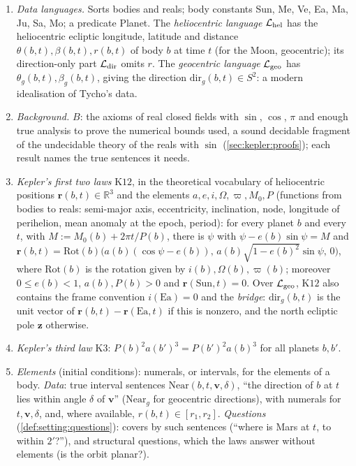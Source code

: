 \begin{definition}\label{def:kepler:language}
\leavevmode
\begin{enumerate}[label=(\roman*),leftmargin=*,itemsep=1pt]
\item \emph{Data languages.} Sorts bodies and reals; body constants Sun, Me, Ve, Ea, Ma, Ju, Sa, Mo; a predicate Planet. The \emph{heliocentric language} $\mathcal L_{\rm hel}$ has the heliocentric ecliptic longitude, latitude and distance $\theta(b,t),\beta(b,t),r(b,t)$ of body $b$ at time $t$ (for the Moon, geocentric); its direction-only part $\mathcal L_{\rm dir}$ omits $r$. The \emph{geocentric language} $\mathcal L_{\rm geo}$ has $\theta_g(b,t),\beta_g(b,t)$, giving the direction $\mathrm{dir}_g(b,t)\in S^2$: a modern idealisation of Tycho's data.
\item \emph{Background.} $B$: the axioms of real closed fields with $\sin$, $\cos$, $\pi$ and enough true analysis to prove the numerical bounds used, a sound decidable fragment of the undecidable theory of the reals with $\sin$ (\cref{sec:kepler:proofs}); each result names the true sentences it needs.
\item \emph{Kepler's first two laws} $\mathrm{K12}$, in the theoretical vocabulary of heliocentric positions $\mathbf r(b,t)\in\mathbb R^3$ and the elements $a,e,i,\Omega,\varpi,M_0,P$ (functions from bodies to reals: semi-major axis, eccentricity, inclination, node, longitude of perihelion, mean anomaly at the epoch, period): for every planet $b$ and every $t$, with $M:=M_0(b)+2\pi t/P(b)$, there is $\psi$ with $\psi-e(b)\sin\psi=M$ and $\mathbf r(b,t)=\mathrm{Rot}(b)\big(a(b)(\cos\psi-e(b)),\,a(b)\sqrt{1-e(b)^2}\sin\psi,\,0\big)$, where $\mathrm{Rot}(b)$ is the rotation given by $i(b),\Omega(b),\varpi(b)$; moreover $0\le e(b)<1$, $a(b),P(b)>0$ and $\mathbf r(\mathrm{Sun},t)=0$. Over $\mathcal L_{\rm geo}$, $\mathrm{K12}$ also contains the frame convention $i(\mathrm{Ea})=0$ and the \emph{bridge}: $\mathrm{dir}_g(b,t)$ is the unit vector of $\mathbf r(b,t)-\mathbf r(\mathrm{Ea},t)$ if this is nonzero, and the north ecliptic pole $\mathbf z$ otherwise.
\item \emph{Kepler's third law} $\mathrm{K3}$: $P(b)^2a(b')^3=P(b')^2a(b)^3$ for all planets $b,b'$.
\item \emph{Elements} (initial conditions): numerals, or intervals, for the elements of a body. \emph{Data}: true interval sentences $\mathrm{Near}(b,t,\mathbf v,\delta)$, ``the direction of $b$ at $t$ lies within angle $\delta$ of $\mathbf v$'' ($\mathrm{Near}_g$ for geocentric directions), with numerals for $t,\mathbf v,\delta$, and, where available, $r(b,t)\in[r_1,r_2]$. \emph{Questions} (\cref{def:setting:questions}): covers by such sentences (``where is Mars at $t$, to within $2'$?''), and structural questions, which the laws answer without elements (is the orbit planar?).
\end{enumerate}
\end{definition}

